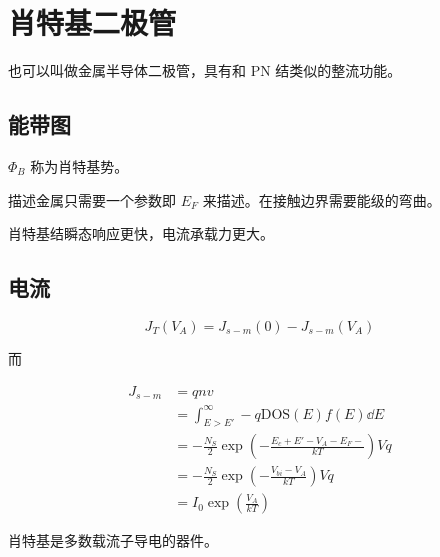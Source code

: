 \documentclass[cn,11pt,chinese,black,simple]{../elegantbook}
\begin{document}
\fi 
\def\chapname{03sbd}

\chapter{肖特基二极管}

也可以叫做金属半导体二极管，具有和 PN 结类似的整流功能。

\section{能带图}

\(\Phi_B\) 称为肖特基势。

描述金属只需要一个参数即 \(E_F\) 来描述。在接触边界需要能级的弯曲。

肖特基结瞬态响应更快，电流承载力更大。

\section{电流}

\[J_T(V_A) = J_{s-m}(0) - J_{s-m}(V_A)\]

而 

\[\begin{aligned}
    J_{s-m} &= q n v \\ 
    &= \int_{E>E'}^\infty -q \text{DOS}(E) f(E)\dd{E} \\
    &= -\frac{ N_S}{2} \exp(-\frac{E_c + E'-V_A - E_F-}{kT}) V q \\ 
    &= -\frac{ N_S}{2} \exp(-\frac{V_{bi} - V_A}{kT}) V q \\ 
    &= I_0 \exp(\frac{V_A}{kT})
\end{aligned}\]

肖特基是多数载流子导电的器件。


\let\chapname\undefined
\ifx\mainclass\undefined
\end{document}
